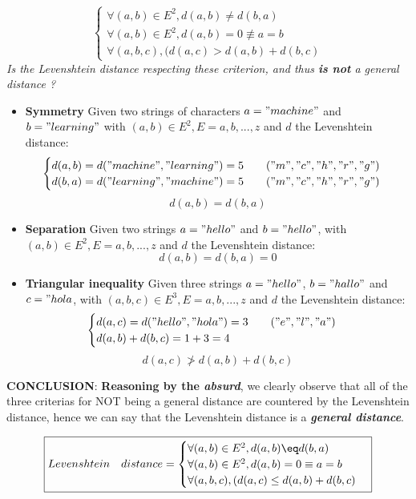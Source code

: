 \documentclass{article}
\begin{document}
\[
\begin{cases}
\forall (a,b) \in E^2, d(a,b) \neq d(b,a) \\
\forall (a,b) \in E^2, d(a,b) = 0 \not\equiv  a=b \\
\forall (a,b,c), (d(a,c) > d(a,b) + d(b,c)
\end{cases}
\]
\newline
\textit{Is the Levenshtein distance respecting these criterion, and thus \textit{\textbf{is not}} a general distance ?}
\newline
\begin{itemize}
    \item \textbf{Symmetry}
    \newline Given two strings of characters $a="machine"$ and $b="learning"$ with $(a,b) \in E^2, E={a,b,...,z}$ and $d$ the Levenshtein distance:
    \[
    \begin{cases}
    d(a,b)=d("machine","learning") = 5 \quad\quad ("m","c","h","r","g") \\
    d(b,a)=d("learning","machine") = 5 \quad\quad ("m","c","h","r","g") 
    \end{cases}
    \]
    $$\boxed{d(a,b)=d(b,a)
    }$$
    \item \textbf{Separation}
    Given two strings $a="hello"$ and $b="hello"$, with $(a,b) \in E^2, E={a,b,...,z}$ and $d$ the Levenshtein distance:
    $$\boxed{d(a,b)=d(b,a)=0
    }$$
    \item \textbf{Triangular inequality}
    Given three strings $a="hello"$, $b="hallo"$ and $c="hola$, with $(a,b,c) \in E^3, E={a,b,...,z}$ and $d$ the Levenshtein distance:
    \[
    \begin{cases}
    d(a,c)=d("hello","hola") = 3 \quad\quad ("e","l","a") \\
    d(a,b) + d(b,c) = 1+3=4 \\
    \end{cases}
    \]
    $$\boxed{d(a,c) \ngtr d(a,b)+d(b,c)}$$
\end{itemize}
\textbf{CONCLUSION}: \textbf{Reasoning by the \textit{absurd}}, we clearly observe that all of the three criterias for NOT being a general distance are countered by the Levenshtein distance, hence we can say that the Levenshtein distance is a \textit{\textbf{general distance}}.

\begin{equation} \label{eq4}
\boxed{
Levenshtein \quad distance = 
\begin{cases}
\forall (a,b) \in E^2, d(a,b) \eq d(b,a) \\
\forall (a,b) \in E^2, d(a,b) = 0 \equiv  a=b \\
\forall (a,b,c), (d(a,c) \leq d(a,b) + d(b,c)
\end{cases}
}
\end{equation}
\end{document}
